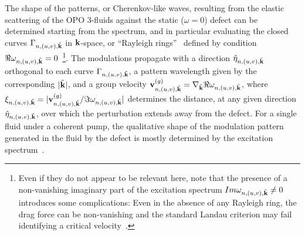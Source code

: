 The shape of the patterns, or Cherenkov-like waves, resulting from the
elastic scattering of the OPO 3-fluids against the static ($\omega=0$)
defect can be determined starting from the spectrum, and in particular
evaluating the closed curves $\Gamma_{n,(u,v), \tilde{\mathbf{k}}}$ in
$\mathbf{k}$-space, or ``Rayleigh rings''~\cite{9783319002651} defined
by condition $\Re \omega_{n,(u,v), \tilde{\mathbf{k}}} =
0$~\footnote{Even if they do not appear to be relevant here, note that
  the presence of a non-vanishing imaginary part of the excitation
  spectrum $Im\omega_{n,(u,v),\tilde{\mathbf{k}}}\neq 0$ introduces some
  complications: Even in the absence of any Rayleigh ring, the drag
  force can be non-vanishing and the standard Landau criterion may
  fail identifying a critical velocity~\cite{Wouters_2010}.}.
%
The modulations propagate with a direction
$\hat{\eta}_{n,(u,v),\tilde{\mathbf{k}}}$ orthogonal to each curve
$\Gamma_{n,(u,v), \tilde{\mathbf{k}}}$, a pattern wavelength given by
the corresponding $|\tilde{\mathbf{k}}|$, and a group velocity
$\mathbf{v}_{n,(u,v),\tilde{\mathbf{k}}}^{(g)}=\nabla_{\tilde{\mathbf{k}}}
\Re \omega_{n,(u,v), \tilde{\mathbf{k}}}$, where
$\xi_{n,(u,v),\tilde{\mathbf{k}}} =
|\mathbf{v}_{n,(u,v),\tilde{\mathbf{k}}}^{(g)} / \Im \omega_{n,(u,v),
  \tilde{\mathbf{k}}}|$ determines the distance, at any given direction
$\hat{\eta}_{n,(u,v),\tilde{\mathbf{k}}}$, over which the perturbation
extends away from the defect. For a single fluid under a coherent
pump, the qualitative shape of the modulation pattern generated in the
fluid by the defect is mostly determined by the excitation
spectrum~\cite{Carusotto_2006,Carusotto_2004}.

